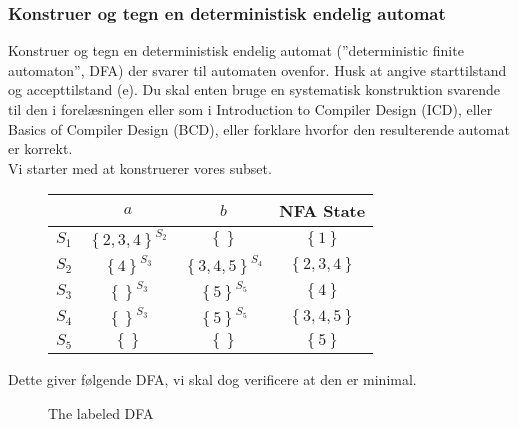 \subsubsection{Konstruer og tegn en deterministisk endelig automat}
Konstruer og tegn en deterministisk endelig automat (''deterministic finite automaton'', DFA) der svarer til automaten ovenfor. Husk at angive starttilstand og accepttilstand (e). Du skal enten bruge en systematisk konstruktion svarende til den i forelæsningen eller som i Introduction to Compiler Design (ICD), eller Basics of Compiler Design (BCD), eller forklare hvorfor den resulterende automat er korrekt.\\
Vi starter med at konstruerer vores subset.
\newpage
\begin{figure}[!ht]\label{fig:nfa2dfa}
  \centering
  \begin{tabular}{c|ccc}
          & $a$ & $b$ & NFA State\\\hline
    $S_1$ & $\left\{2, 3,4\right\}^{S_2}$ & $\left\{\right\}$ & $\left\{1\right\}$ \\
    $S_2$ & $\left\{4\right\}^{S_3}$ & $\left\{3,4,5\right\}^{S_4}$ & $\left\{2,3,4\right\}$\\
    $S_3$ & $\left\{\right\}^{S_3}$ & $\left\{5\right\}^{S_5}$ & $\left\{4\right\}$\\
    $S_4$ & $\left\{\right\}^{S_3}$ & $\left\{5\right\}^{S_5}$ & $\left\{3,4,5\right\}$\\
    $S_5$ & $\left\{\right\}$ & $\left\{\right\}$ & $\left\{5\right\}$
  \end{tabular}
\end{figure}
\noindent Dette giver følgende DFA, vi skal dog verificere at den er minimal.
\begin{figure}[!ht]\label{fig:examfigdfa}
    \centering
    \caption{The labeled DFA}
\end{figure}\\
